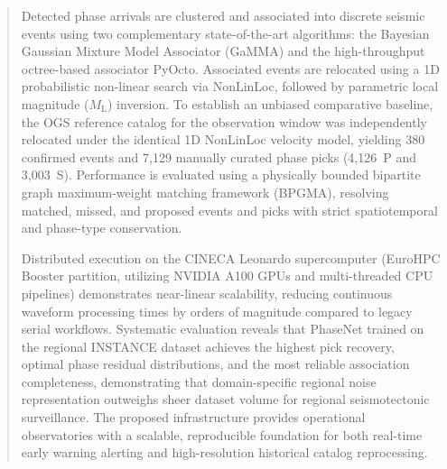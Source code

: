 \begin{abstract}
Detected phase arrivals are clustered and associated into discrete seismic events using two complementary state-of-the-art algorithms: the Bayesian Gaussian Mixture Model Associator (\ac{GaMMA}) and the high-throughput octree-based associator \ac{PyOcto}. Associated events are relocated using a 1D probabilistic non-linear search via \ac{NonLinLoc}, followed by parametric local magnitude ($M_{\mathrm{L}}$) inversion. To establish an unbiased comparative baseline, the OGS reference catalog for the observation window was independently relocated under the identical 1D \ac{NonLinLoc} velocity model, yielding 380 confirmed events and 7,129 manually curated phase picks (4,126~P and 3,003~S). Performance is evaluated using a physically bounded bipartite graph maximum-weight matching framework (\ac{BPGMA}), resolving matched, missed, and proposed events and picks with strict spatiotemporal and phase-type conservation.

Distributed execution on the CINECA Leonardo supercomputer (EuroHPC Booster partition, utilizing NVIDIA A100 GPUs and multi-threaded CPU pipelines) demonstrates near-linear scalability, reducing continuous waveform processing times by orders of magnitude compared to legacy serial workflows. Systematic evaluation reveals that PhaseNet trained on the regional \ac{INSTANCE} dataset achieves the highest pick recovery, optimal phase residual distributions, and the most reliable association completeness, demonstrating that domain-specific regional noise representation outweighs sheer dataset volume for regional seismotectonic surveillance. The proposed infrastructure provides operational observatories with a scalable, reproducible foundation for both real-time early warning alerting and high-resolution historical catalog reprocessing.
\end{abstract}
